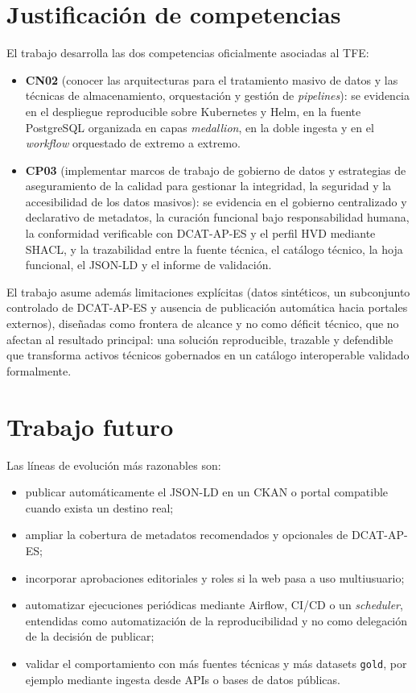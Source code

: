 \section{Justificación de competencias}

El trabajo desarrolla las dos competencias oficialmente asociadas al TFE:

\begin{itemize}
  \item \textbf{CN02} (conocer las arquitecturas para el tratamiento masivo de datos y las técnicas de almacenamiento, orquestación y gestión de \emph{pipelines}): se evidencia en el despliegue reproducible sobre Kubernetes y Helm, en la fuente PostgreSQL organizada en capas \emph{medallion}, en la doble ingesta y en el \emph{workflow} orquestado de extremo a extremo.
  \item \textbf{CP03} (implementar marcos de trabajo de gobierno de datos y estrategias de aseguramiento de la calidad para gestionar la integridad, la seguridad y la accesibilidad de los datos masivos): se evidencia en el gobierno centralizado y declarativo de metadatos, la curación funcional bajo responsabilidad humana, la conformidad verificable con DCAT-AP-ES y el perfil HVD mediante SHACL, y la trazabilidad entre la fuente técnica, el catálogo técnico, la hoja funcional, el JSON-LD y el informe de validación.
\end{itemize}

El trabajo asume además limitaciones explícitas (datos sintéticos, un subconjunto controlado de DCAT-AP-ES y ausencia de publicación automática hacia portales externos), diseñadas como frontera de alcance y no como déficit técnico, que no afectan al resultado principal: una solución reproducible, trazable y defendible que transforma activos técnicos gobernados en un catálogo interoperable validado formalmente.

\section{Trabajo futuro}

Las líneas de evolución más razonables son:

\begin{itemize}
  \item publicar automáticamente el JSON-LD en un CKAN o portal compatible cuando exista un destino real;
  \item ampliar la cobertura de metadatos recomendados y opcionales de DCAT-AP-ES;
  \item incorporar aprobaciones editoriales y roles si la web pasa a uso multiusuario;
  \item automatizar ejecuciones periódicas mediante Airflow, CI/CD o un \emph{scheduler}, entendidas como automatización de la reproducibilidad y no como delegación de la decisión de publicar;
  \item validar el comportamiento con más fuentes técnicas y más datasets \texttt{gold}, por ejemplo mediante ingesta desde APIs o bases de datos públicas.
\end{itemize}
